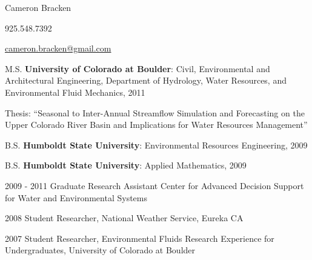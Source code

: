 \documentclass[10pt,a4paper]{scrartcl}
\begin{document}
    \begin{cv}{}
        \begin{cvlist}{}\label{info}  
            \item   Cameron Bracken
            \item 925.548.7392
            \item   \url{cameron.bracken@gmail.com}
        \end{cvlist}
        
        \begin{cvlist}{}\label{edu}
            \item[M.S.] \textbf{University of Colorado at Boulder}: { Civil, Environmental and Architectural Engineering, Department of Hydrology, Water Resources, and Environmental Fluid Mechanics},  2011
            \item Thesis: ``Seasonal to Inter-Annual Streamflow Simulation and Forecasting on the Upper Colorado River Basin and Implications for Water Resources Management''
            \item[B.S.] \textbf{Humboldt State University}: {Environmental Resources Engineering}, 2009
            \item[B.S.] \textbf{Humboldt State University}: {Applied Mathematics}, 2009
        \end{cvlist}
        
        \begin{cvlist}{}\label{exp}
            {\setlength{\itemsep}{1pt}
            \setlength{\parskip}{0pt}
            \setlength{\parsep}{0pt}
            
            \item[2009 - 2011] Graduate Research Assistant Center for Advanced Decision Support for Water and Environmental Systems
            }
            \item[2008] Student Researcher, National Weather Service, Eureka CA
            \item[2007] Student Researcher, Environmental Fluids Research Experience for Undergraduates, University of Colorado at Boulder
        \end{cvlist}
        

\end{cv}
\end{document}
